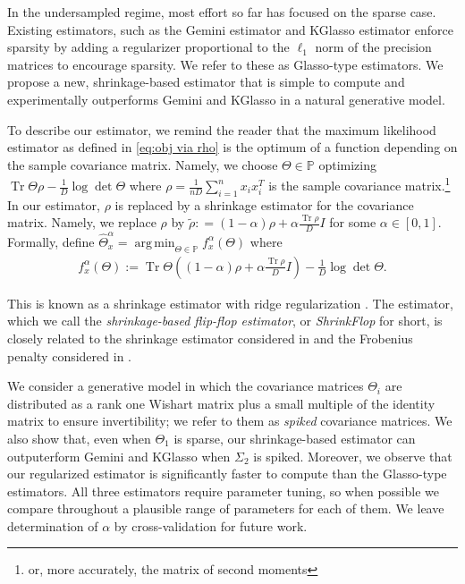 \documentclass[aos]{imsart}
\theoremstyle{definition}
\numberwithin{equation}{section}
\DeclareMathOperator{\tr}{Tr}
\DeclareMathOperator*{\argmin}{arg\,min}
\renewcommand{\P}{{\mathbb{P}}}
\newcommand{\samp}{x}
\begin{document}
In the undersampled regime, most effort so far has focused on the sparse case.
Existing estimators, such as the Gemini estimator \cite{zhou2014gemini} and KGlasso estimator \cite{tsiligkaridis2013convergence} enforce sparsity by adding a regularizer proportional to the $\ell_1$ norm of the precision matrices to encourage sparsity.
We refer to these as Glasso-type estimators.
We propose a new, shrinkage-based estimator that is simple to compute and experimentally outperforms Gemini and KGlasso in a natural generative model.

To describe our estimator, we remind the reader that the maximum likelihood estimator as defined in \cref{eq:obj via rho} is the optimum of a function depending on the sample covariance matrix.
Namely, we choose $\Theta \in \P$ optimizing $\tr \Theta \rho - \frac{1}{D}\log \det \Theta$ where $\rho = \frac{1}{n D} \sum_{i = 1}^n x_i x_i^T$ is the sample covariance matrix.\footnote{or, more accurately, the matrix of second moments}
In our estimator, $\rho$ is replaced by a shrinkage estimator for the covariance matrix.
Namely, we replace $\rho$ by $\tilde{\rho}: = (1- \alpha) \rho + \alpha \frac{\tr \rho}{D} I $ for some $\alpha \in [0,1]$. Formally, define $\widehat{\Theta}^\alpha_x = \argmin_{\Theta \in \P} f^\alpha_\samp(\Theta)$ where
\begin{align*}
  f_{\samp}^\alpha(\Theta)
  :=  \tr \Theta \left((1 - \alpha) \rho + \alpha \frac{\tr \rho}{D} I\right) - \frac{1}{D}\log\det\Theta.
\end{align*}

This is known as a shrinkage estimator with ridge regularization \citep{warton2008penalized}.
The estimator, which we call the \emph{shrinkage-based flip-flop estimator}, or \emph{ShrinkFlop} for short, is closely related to the shrinkage estimator considered in \cite{goes2020robust} and the Frobenius penalty considered in \cite{tang2018integrated}.

We consider a generative model in which the covariance matrices $\Theta_i$ are distributed as a rank one Wishart matrix plus a small multiple of the identity matrix to ensure invertibility; we refer to them as \emph{spiked} covariance matrices.
We also show that, even when $\Theta_1$ is sparse, our shrinkage-based estimator can outputerform Gemini and KGlasso when $\Sigma_2$ is spiked.
Moreover, we observe that our regularized estimator is significantly faster to compute than the Glasso-type estimators. All three estimators require parameter tuning, so when possible we compare throughout a plausible range of parameters for each of them. We leave determination of $\alpha$ by cross-validation for future work.
\end{document}
